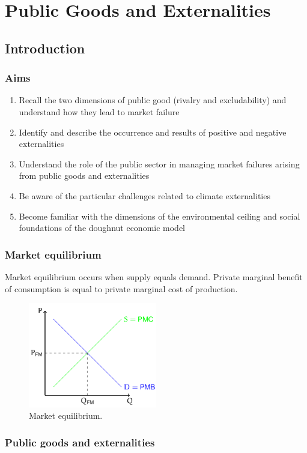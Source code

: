 \chapter{Public Goods and Externalities}
\section{Introduction}
\subsection{Aims}
\begin{enumerate}
  \item Recall the two dimensions of public good (rivalry and excludability) and understand how they lead to market failure
  \item Identify and describe the occurrence and results of positive and negative externalities
  \item Understand the role of the public sector in managing market failures arising from public goods and externalities
  \item Be aware of the particular challenges related to climate externalities
  \item Become familiar with the dimensions of the environmental ceiling and social foundations of the doughnut economic model
\end{enumerate}
\subsection{Market equilibrium}
Market equilibrium occurs when supply equals demand. Private marginal benefit of consumption is equal to private marginal cost of production.
\begin{figure}[H]
  \centering
  \includegraphics[width = 0.5\textwidth]{./img/figure13.png}
  \caption{Market equilibrium.}
\end{figure}
\subsection{Public goods and externalities}
